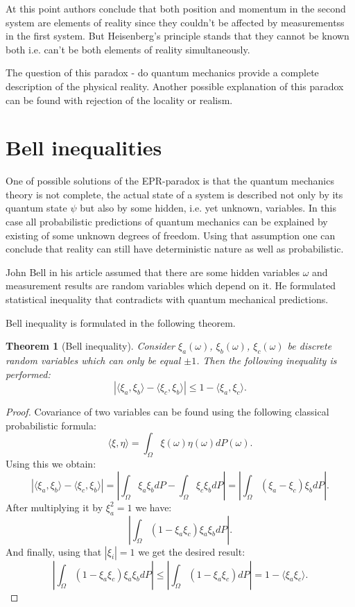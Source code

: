 \documentclass[11pt]{article}
\newtheorem{theorem}{Theorem}[section]
\begin{document}
At this point authors conclude that both position and momentum in the second system are elements of reality since they couldn't be affected by measurementss in the first system. But Heisenberg's principle stands that they cannot be known both i.e. can't be both elements of reality simultaneously. 

The question of this paradox - do quantum mechanics provide a complete description of the physical reality. Another possible explanation of this paradox can be found with rejection of the locality or realism.

\section{Bell inequalities}
One of possible solutions of the EPR-paradox is that the quantum mechanics theory is not complete, the actual state of a system is described not only by its quantum state $\psi$ but also by some hidden, i.e. yet unknown, variables. In this case all probabilistic predictions of quantum mechanics can be explained by existing of some unknown degrees of freedom. Using that assumption one can conclude that reality can still have deterministic nature as well as probabilistic.

John Bell in his article \cite{Bell} assumed that there are some hidden variables $\omega$ and measurement results are random variables which depend on it. He formulated statistical inequality that contradicts with quantum mechanical predictions.

Bell inequality is formulated in the following theorem.
\begin{theorem}[Bell inequality]
Consider $\xi_a(\omega)$, $\xi_b(\omega)$, $\xi_c(\omega)$ be discrete random variables which can only be equal $\pm 1$. Then the following inequality is performed:
\[
| \langle\xi_a,\xi_b\rangle -  \langle\xi_c,\xi_b\rangle | \leq 1 - \langle\xi_a,\xi_c\rangle.
\]
\end{theorem}

\begin{proof}
Covariance of two variables can be found using the following classical probabilistic formula:
\[
\langle \xi, \eta \rangle = \int_\Omega \xi(\omega)\eta(\omega)dP(\omega).
\]
Using this we obtain:
\[
| \langle\xi_a,\xi_b\rangle -  \langle\xi_c,\xi_b\rangle | = \left| \int_\Omega\xi_a\xi_b dP - \int_\Omega\xi_c\xi_b dP\right| = \left|\int_\Omega (\xi_a - \xi_c)\xi_bdP \right|.
\]
After multiplying it by $\xi_a^2 = 1$ we have:
\[
\left|\int_\Omega (1 - \xi_a\xi_c)\xi_a\xi_bdP \right|.
\]
And finally, using that $|\xi_i| = 1$ we get the desired result:
\[
\left|\int_\Omega (1 - \xi_a\xi_c)\xi_a\xi_bdP \right| \leq  \left|\int_\Omega (1 - \xi_a\xi_c)dP\right| = 1 - \langle \xi_a\xi_c\rangle.
\]
\end{proof}
\end{document}
